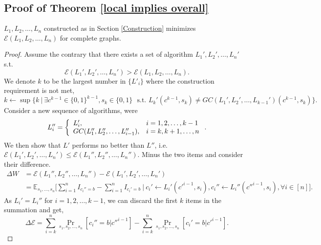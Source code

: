 \documentclass[a4paper,UKenglish]{lipics}
\theoremstyle{definition}
\begin{document}
\subsection{Proof of Theorem \ref{local implies overall}}
\label{subsec:local implies overall}

$L_1, L_2, \dots, L_n$ constructed as in Section \ref{Construction} minimizes $\mathcal{E}(L_1, L_2, \dots, L_n)$ for complete graphs.

\begin{proof}
Assume the contrary that there exists a set of algorithm $L_1', L_2', \dots, L_n'$ s.t. 
\begin{equation*} 
	\mathcal{E}(L_1', L_2', \dots, L_n') 
	> 
	\mathcal{E}(L_1, L_2, \dots, L_n). 
\end{equation*}
We denote $k$ to be the largest number in $\{L'_i\}$ where the construction requirement is not met,
\begin{equation*}
	k 
\gets 
	\sup \Big\{ 
		k 
		~\Big|~ 
		\exists c^{k-1} \in \{0,1\}^{k-1}, s_k\in \{0,1\} 
		\text{ ~s.t.~} 
		L_k'(c^{k-1}, s_k) \not= GC(L_1', L_2', \dots, L_{k-1}')(c^{k-1}, s_k)
	\Big\}.
\end{equation*}
Consider a new sequence of algorithms, were
\begin{equation*}
	L_i'' 
	= 
	\left\{ 
		\begin{array}{l l}
			L_i', & i=1,2,\dots,k-1  \\
			GC(L_1'', L_2'', \dots, L_{i-1}''), & i=k,k+1,\dots,n
		\end{array}
	\right..
\end{equation*}
We then show that $L'$ performs no better than $L''$, i.e.
$
	\mathcal{E}(L_1', L_2', \dots, L_n')
	\leq 
	\mathcal{E}(L_1'', L_2'', \dots, L_n'').
$
Minus the two items and consider their difference.
\begin{align*}
	\Delta W
& = 
	\mathcal{E}(L_1'', L_2'', \dots, L_n'') - \mathcal{E}(L_1', L_2', \dots, L_n') 
\\
& = 
	\mathbb E_{s_1, \dots, s_n} \Big[ 
		\sum_{i=1}^n I_{c_i''=b} - \sum_{i=1}^n I_{c_i'=b} 
		~\Big|~
		c_i' \gets L_i'(c'^{i-1}, s_i), 
		c_i'' \gets L_i''(c''^{i-1}, s_i), \forall i \in [n] 
	\Big].
\end{align*}
As $L_i'=L_i''$ for $i=1,2,\dots,k-1$, we can discard the first $k$ items in the summation and get,
\begin{equation*}
	\Delta \mathcal{E} 
=
	\sum_{i=k}^n \Pr_{s_1, s_2, \dots, s_n} [c_i'' = b|c''^{i-1}] - 
	\sum_{i=k}^n \Pr_{s_1, s_2, \dots, s_n} [c_i' = b|c'^{i-1}].

\end{equation*}
\end{proof}
\end{document}

